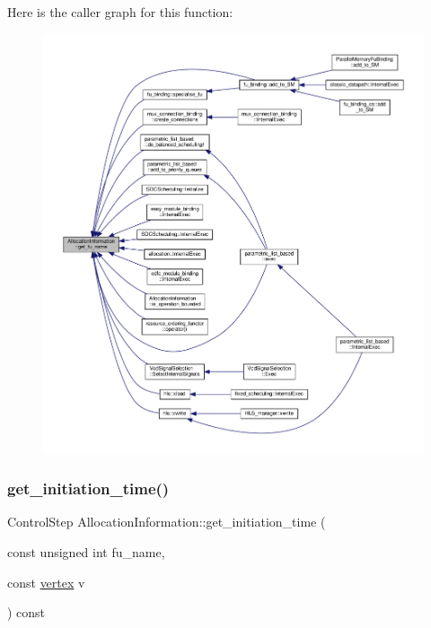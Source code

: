 Here is the caller graph for this function\+:
\nopagebreak
\begin{figure}[H]
\begin{center}
\leavevmode
\includegraphics[width=350pt]{d7/d79/classAllocationInformation_a0dcc17e5484d9fad547e371fb2fd26ef_icgraph}
\end{center}
\end{figure}
\mbox{\label{classAllocationInformation_a4e2b7808fff53d834b80063761b3d802}} 
\subsubsection{\texorpdfstring{get\+\_\+initiation\+\_\+time()}{get\_initiation\_time()}\hspace{0.1cm}{\footnotesize\ttfamily [1/2]}}
{\footnotesize\ttfamily Control\+Step Allocation\+Information\+::get\+\_\+initiation\+\_\+time (\begin{DoxyParamCaption}\item[{const unsigned int}]{fu\+\_\+name,  }\item[{const \hyperlink{graph_8hpp_abefdcf0544e601805af44eca032cca14}{vertex}}]{v }\end{DoxyParamCaption}) const}



